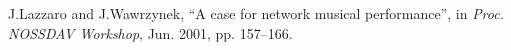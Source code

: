 
J.Lazzaro and J.Wawrzynek, ``A case for network musical performance'', in \emph{Proc. NOSSDAV Workshop}, Jun. 2001, pp. 157--166. 



